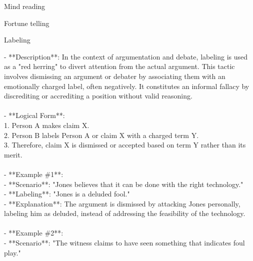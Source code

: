 \documentclass[a4paper,12pt,single,pdftex]{scrbook}
\begin{document}
Mind reading

Fortune telling

Labeling
    
      - **Description**: In the context of argumentation and debate, labeling is used as a "red herring" to divert attention from the actual argument. This tactic involves dismissing an argument or debater by associating them with an emotionally charged label, often negatively. It constitutes an informal fallacy by discrediting or accrediting a position without valid reasoning.
    \\

    
      
    \\

    
      - **Logical Form**:
    \\

    
        1. Person A makes claim X.
    \\

    
        2. Person B labels Person A or claim X with a charged term Y.
    \\

    
        3. Therefore, claim X is dismissed or accepted based on term Y rather than its merit.
    \\

    
      
    \\

    
      - **Example \#1**:
    \\

    
        - **Scenario**: "Jones believes that it can be done with the right technology."
    \\

    
        - **Labeling**: "Jones is a deluded fool."
    \\

    
        - **Explanation**: The argument is dismissed by attacking Jones personally, labeling him as deluded, instead of addressing the feasibility of the technology.
    \\

    
      
    \\

    
      - **Example \#2**:
    \\

    
        - **Scenario**: "The witness claims to have seen something that indicates foul play."
    \\
\end{document}
